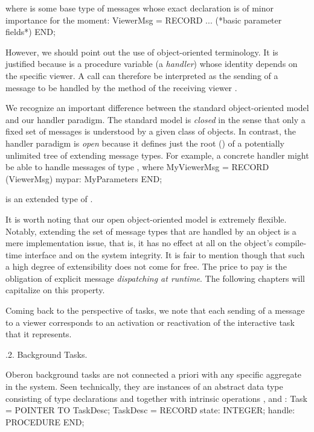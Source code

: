 \noindent where  is some base type of messages whose exact declaration is of minor importance for the moment:
\begintt
ViewerMsg = RECORD ... (*basic parameter fields*) END;
\endtt

\noindent However, we should point out the use of object-oriented
terminology. It is justified because  is a procedure variable (a
\emph{handler}) whose identity depends on the specific viewer. A call
 can therefore be interpreted as the sending of a
message  to be handled by the method of the receiving viewer .

We recognize an important difference between the standard
object-oriented model and our handler paradigm. The standard model is
\emph{closed} in the sense that only a fixed set of messages is understood by
a given class of objects. In contrast, the handler paradigm is \emph{open}
because it defines just the root () of a potentially
unlimited tree of extending message types. For example, a concrete
handler might be able to handle messages of type , where
\begintt
MyViewerMsg = RECORD (ViewerMsg)
  mypar: MyParameters
END;
\endtt

\noindent is an extended type of .

It is worth noting that our open object-oriented model is extremely
flexible. Notably, extending the set of message types that are handled
by an object is a mere implementation issue, that is, it has no effect
at all on the object’s compile-time interface and on the system
integrity. It is fair to mention though that such a high degree of
extensibility does not come for free. The price to pay is the
obligation of explicit message \emph{dispatching at runtime}. The following
chapters will capitalize on this property.

Coming back to the perspective of tasks, we note that each sending of
a message to a viewer corresponds to an activation or reactivation of
the interactive task that it represents.

.2. Background Tasks.

Oberon background tasks are not connected a priori with any specific
aggregate in the system. Seen technically, they are instances of an
abstract data type consisting of type declarations  and 
together with intrinsic operations ,  and :
\begintt
Task = POINTER TO TaskDesc;
TaskDesc = RECORD state: INTEGER; handle: PROCEDURE END;


